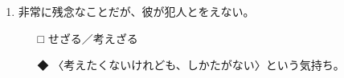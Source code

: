 \documentclass[
uplatex,
b5paper,
10pt,
dvipdfmx
]{jsbook}
\begin{document}
\begin{enumerate}
\item 非常に残念なことだが、彼が犯人と\underline{\hspace{3zw}}をえない。
\begin{itemize}
\item[□] せざる／考えざる
\item[◆] 〈考えたくないけれども、しかたがない〉という気持ち。
\end{itemize}
\end{enumerate}



\begin{enumerate}
\setcounter{enumi}{30}


\end{enumerate}
\end{document}
